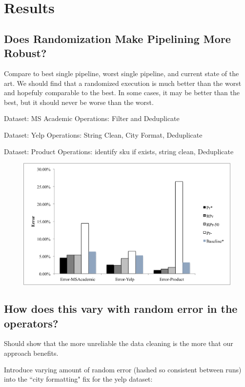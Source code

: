 \section{Results}

\subsection{Does Randomization Make Pipelining More Robust?}
Compare to best single pipeline, worst single pipeline, and current state of the art.
We should find that a randomized execution is much better than the worst and hopefuly comparable to the best.
In some cases, it may be better than the best, but it should never be worse than the worst.

Dataset: MS Academic 
Operations: Filter and Deduplicate

Dataset: Yelp 
Operations: String Clean, City Format, Deduplicate

Dataset: Product 
Operations: identify sku if exists, string clean, Deduplicate

\begin{figure}[ht]
\centering
\includegraphics[scale=0.4]{fig1.png}
\caption{}
\label{exp:ms-academic-ranking}
\end{figure}

\subsection{How does this vary with random error in the operators?}
Should show that the more unreliable the data cleaning is the more that our approach benefits.

Introduce varying amount of random error (hashed so consistent between runs) into the ``city formatting" fix for the yelp dataset:

